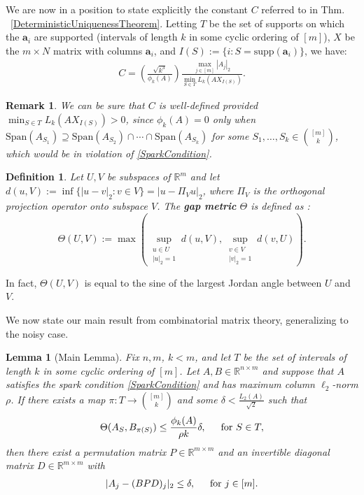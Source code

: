 \documentclass[journal, twocolumn]{IEEEtran}
\newtheorem{lemma}{Lemma}
\newtheorem{definition}{Definition}
\newtheorem{remark}{Remark}
\begin{document}
We are now in a position to state explicitly the constant $C$ referred to in Thm. ~\ref{DeterministicUniquenessTheorem}. Letting $T$ be the set of supports on which the $\mathbf{a}_i$ are supported (intervals of length $k$ in some cyclic ordering of $[m]$), $X$ be the $m \times N$ matrix with columns $\mathbf{a}_i$, and $I(S) := \{i : S = \text{supp}(\mathbf{a}_i)\}$, we have:
\begin{align}\label{Cdef}
C = \left( \frac{ \sqrt{k^3}}{ \phi_k(A) } \right) \frac{\max_{j \in [m]} |A_j|_2}{\min_{S \in T} L_k(AX_{I(S)})}.
\end{align}

\begin{remark}\label{nonzero}
We can be sure that $C$ is well-defined provided $\min_{S \in T} L_k(AX_{I(S)}) > 0$, since $\phi_k(A) = 0$ only when $\text{Span}(A_{S_1}) \supseteq \text{Span}(A_{S_2}) \cap \cdots \cap \text{Span}(A_{S_k})$ for some $S_1, \ldots, S_k \in {[m] \choose k}$, which would be in violation of \eqref{SparkCondition}.
\end{remark}

\begin{definition}\label{GapMetricDef}
Let $U, V$ be subspaces of $\mathbb{R}^m$ and let $d(u,V) := \inf\{|u-v|_2: v \in V\} = |u - \Pi_V u|_2$, where $\Pi_V$ is the orthogonal projection operator onto subspace $V$. The \textbf{gap metric} $\Theta$ is defined as \cite{Akhiezer13}:
\begin{equation*}
\Theta(U,V) := \max\left( \sup_{\substack{u \in U \\ |u|_2 = 1}} d(u,V), \sup_{\substack{v \in V \\ |v|_2 = 1}} d(v,U) \right).
\end{equation*}
\end{definition}

In fact, $\Theta(U,V)$ is equal to the sine of the largest Jordan angle between $U$ and $V$. 

We now state our main result from combinatorial matrix theory, generalizing \cite[Lem.~1]{Hillar15} to the noisy case.

\begin{lemma}[Main Lemma]\label{MainLemma}
Fix $n, m$, $k < m$, and let $T$ be the set of intervals of length $k$ in some cyclic ordering of $[m]$. Let $A, B \in \mathbb{R}^{n \times m}$ and suppose that $A$ satisfies the spark condition \eqref{SparkCondition} and has maximum column $\ell_2$-norm $\rho$.  If there exists a map $\pi: T \to {[m] \choose k}$ and some $\delta < \frac{L_{2}(A)}{\sqrt{2}}$ such that 
\begin{equation}\label{GapUpperBound}
\Theta(A_{S}, B_{\pi(S)}) \leq \frac{ \phi_k(A) }{\rho k} \delta, \indent \text{for } S \in T,
\end{equation}
%
then there exist a permutation matrix $P \in \mathbb{R}^{m \times m}$ and an invertible diagonal matrix $D \in \mathbb{R}^{m \times m}$ with
\begin{align*}
|A_j - (BPD)_j|_2 \leq \delta, \indent \text{for } j \in [m].
\end{align*}
\end{lemma}
\end{document}
